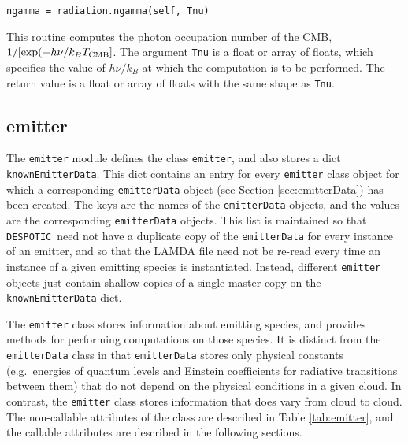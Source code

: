 \documentclass[12pt]{article}
\newcommand{\despotic}{\texttt{DESPOTIC}}
\begin{document}
\begin{verbatim}
ngamma = radiation.ngamma(self, Tnu)
\end{verbatim}

This routine computes the photon occupation number of the CMB, $1/[\exp(-h\nu/k_B T_{\rm CMB}]$. The argument \verb=Tnu= is a float or array of floats, which specifies the value of $h\nu/k_B$ at which the computation is to be performed. The return value is a float or array of floats with the same shape as \verb=Tnu=.

\clearpage

\subsection{emitter}
\label{sec:emitter}

The \verb=emitter= module defines the class \verb=emitter=, and also stores a dict \verb=knownEmitterData=. This dict contains an entry for every \verb=emitter= class object for which a corresponding \verb=emitterData= object (see Section \ref{sec:emitterData}) has been created. The keys are the names of the \verb=emitterData= objects, and the values are the corresponding \verb=emitterData= objects. This list is maintained so that \despotic\ need not have a duplicate copy of the \verb=emitterData= for every instance of an emitter, and so that the LAMDA file need not be re-read every time an instance of a given emitting species is instantiated. Instead, different \verb=emitter= objects just contain shallow copies of a single master copy on the \verb=knownEmitterData= dict.

The \verb=emitter= class stores information about emitting species, and provides methods for performing computations on those species. It is distinct from the \verb=emitterData= class in that \verb=emitterData= stores only physical constants (e.g.~energies of quantum levels and Einstein coefficients for radiative transitions between them) that do not depend on the physical conditions in a given cloud. In contrast, the \verb=emitter= class stores information that does vary from cloud to cloud. The non-callable attributes of the class are described in Table \ref{tab:emitter}, and the callable attributes are described in the following sections.
\end{document}
